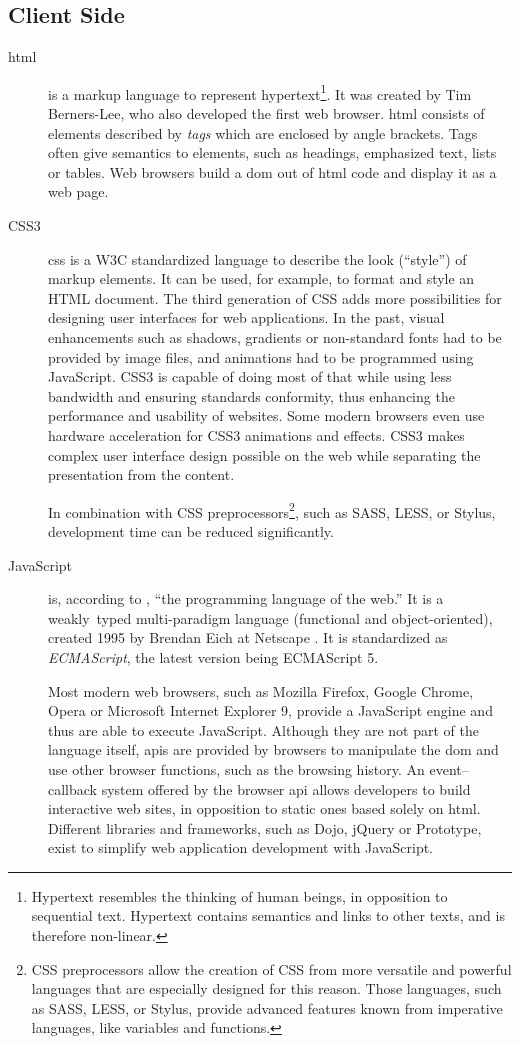 \subsection{Client Side}
\begin{description}
	\item[\gls{html}] is a markup language to represent hypertext\footnote{Hypertext resembles the thinking of human beings, in opposition to sequential text. Hypertext contains semantics and links to other texts, and is therefore non-linear.}. It was created by Tim Berners-Lee, who also developed the first web browser. \gls{html} consists of elements described by \emph{tags} which are enclosed by angle brackets. Tags often give semantics to elements, such as headings, emphasized text, lists or tables. Web browsers build a \gls{dom} out of \gls{html} code and display it as a web page.
	\item[CSS3] \gls{css} is a W3C standardized language to describe the look (``style'') of markup elements. It can be used, for example, to format and style an HTML document. The third generation of CSS adds more possibilities for designing user interfaces for web applications. In the past, visual enhancements such as shadows, gradients or non-standard fonts had to be provided by image files, and animations had to be programmed using JavaScript. CSS3 is capable of doing most of that while using less bandwidth and ensuring standards conformity, thus enhancing the performance and usability of websites. Some modern browsers even use hardware acceleration for CSS3 animations and effects. CSS3 makes complex user interface design possible on the web while separating the presentation from the content.

	In combination with CSS preprocessors\footnote{CSS preprocessors allow the creation of CSS from more versatile and powerful languages that are especially designed for this reason. Those languages, such as SASS, LESS, or Stylus, provide advanced features known from imperative languages, like variables and functions.}, such as SASS, LESS, or Stylus, development time can be reduced significantly.
	\item[JavaScript] is, according to , ``the programming language of the web.'' It is a weakly~typed multi-paradigm language (functional and object-oriented), created 1995 by Brendan Eich at Netscape \cite{eich}. It is standardized as \emph{ECMAScript}, the latest version being ECMAScript 5.

	Most modern web browsers, such as Mozilla Firefox, Google Chrome, Opera or Microsoft Internet Explorer 9, provide a JavaScript engine and thus are able to execute JavaScript. Although they are not part of the language itself, \glspl{api} are provided by browsers to manipulate the \gls{dom} and use other browser functions, such as the browsing history. An event--callback system offered by the browser \gls{api} allows developers to build interactive web sites, in opposition to static ones based solely on \gls{html}. Different libraries and frameworks, such as Dojo, jQuery or Prototype, exist to simplify web application development with JavaScript.


\end{description}
